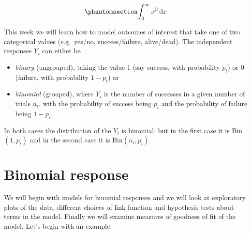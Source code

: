 \documentclass[
  a4paper,
  DIV=11,
  numbers=noendperiod,
  oneside]{scrreport}
\newcommand{\dx}{\,\text{d}x}
\begin{document}
\begin{equation}\phantomsection\label{eq-AROC}{
\begin{aligned}
\int_0^{\infty} x^3 \dx
\end{aligned}
}\end{equation}

This week we will learn how to model outcomes of interest that take one
of two categorical values (e.g.~yes/no, success/failure, alive/dead).
The independent responses \(Y_i\) can either be

\begin{itemize}
\item
  \emph{binary} (ungrouped), taking the value 1 (say success, with
  probability \(p_i\)) or 0 (failure, with probability \(1-p_i\)) or
\item
  \emph{binomial} (grouped), where \(Y_i\) is the number of successes in
  a given number of trials \(n_i\), with the probability of success
  being \(p_i\) and the probability of failure being \(1-p_i\).
\end{itemize}

In both cases the distribution of the \(Y_i\) is binomial, but in the
first case it is Bin\((1,p_i)\) and in the second case it is
Bin\((n_i,p_i)\).

\section{Binomial response}\label{binomial-response}

We will begin with models for binomial responses and we will look at
exploratory plots of the data, different choices of link function and
hypothesis tests about terms in the model. Finally we will examine
measures of goodness of fit of the model. Let's begin with an example.
\end{document}
